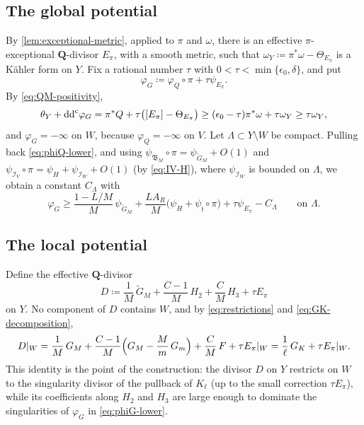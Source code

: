 \documentclass[11pt,a4paper]{amsart}
\theoremstyle{definition}
\begin{document}
\subsection{The global potential}

By \cref{lem:exceptional-metric}, applied to $\pi$ and $\omega$, there is an
effective $\pi$-exceptional $\mathbf Q$-divisor $E_\pi$, with a smooth
metric, such that $\omega_Y\coloneqq \pi^*\omega-\Theta_{E_\pi}$ is a
K\"ahler form on $Y$. Fix a rational number $\tau$ with
$0<\tau<\min\{\epsilon_0,\delta\}$, and put
\[
  \varphi_G\coloneqq \varphi_Q\circ\pi+\tau\psi_{E_\pi}.
\]
By \eqref{eq:QM-positivity},
\[
  \theta_Y+\mathrm{dd}^{\mathrm{c}}\varphi_G
  =\pi^*Q+\tau\bigl([E_\pi]-\Theta_{E_\pi}\bigr)
  \ge(\epsilon_0-\tau)\pi^*\omega+\tau\omega_Y
  \ge\tau\omega_Y ,
\]
and $\varphi_G=-\infty$ on $W$, because $\varphi_Q=-\infty$ on $V$. Let
$\Lambda\subset Y\setminus W$ be compact. Pulling back
\eqref{eq:phiQ-lower}, and using
$\psi_{\mathfrak B_M}\circ\pi=\psi_{\widetilde G_M}+O(1)$ and
$\psi_{\mathcal I_V}\circ\pi=\psi_H+\psi_{\mathcal I_W}+O(1)$ (by
\eqref{eq:IV-H}), where $\psi_{\mathcal I_W}$ is bounded on $\Lambda$, we
obtain a constant $C_\Lambda$ with
\begin{equation}\label{eq:phiG-lower}
  \varphi_G\ge\frac{1-L/M}M\,\psi_{\widetilde G_M}
   +\frac{LA_R}M\bigl(\psi_H+\psi_{\mathfrak j}\circ\pi\bigr)
   +\tau\psi_{E_\pi}-C_\Lambda
  \qquad\text{on }\Lambda .
\end{equation}

\subsection{The local potential}

Define the effective $\mathbf Q$-divisor
\begin{equation}\label{eq:def-D}
  D\coloneqq \frac1M\,\widetilde G_M+\frac{C-1}M\,H_2+\frac CM\,H_3
  +\tau E_\pi
\end{equation}
on $Y$. No component of $D$ contains $W$, and by \eqref{eq:restrictions}
and \eqref{eq:GK-decomposition},
\begin{equation}\label{eq:D-restriction}
  D|_W=\frac1M\,G_M+\frac{C-1}M\Bigl(G_M-\frac Mm\,G_m\Bigr)+\frac CM\,F
       +\tau E_\pi|_W
  =\frac1\ell\,G_K+\tau E_\pi|_W .
\end{equation}
This identity is the point of the construction: the divisor $D$ on $Y$
restricts on $W$ to the singularity divisor of the pullback of $K_\ell$
(up to the small correction $\tau E_\pi$), while its coefficients along
$H_2$ and $H_3$ are large enough to dominate the singularities of
$\varphi_G$ in \eqref{eq:phiG-lower}.
\end{document}
